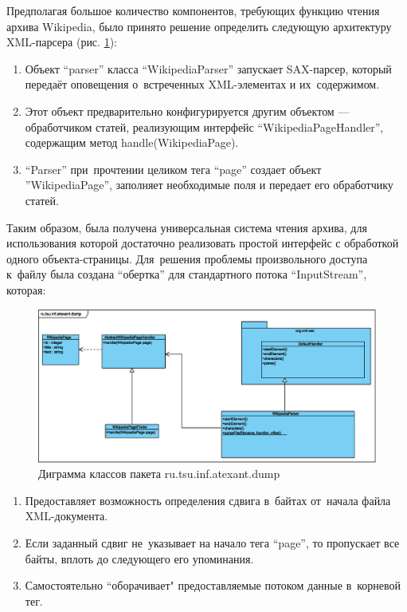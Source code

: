 Предполагая большое количество компонентов, требующих функцию чтения архива Wikipedia,
было принято решение определить следующую архитектуру XML-парсера (рис. \ref{uml:ru.tsu.inf.atexant.dump}):

\begin{enumerate}

\item{
Объект ``parser'' класса ``WikipediaParser'' запускает SAX-парсер, 
который передаёт оповещения о~встреченных XML-элементах и их~содержимом.
}

\item {
Этот объект предварительно конфигурируется другим объектом --- обработчиком статей,
 реализующим интерфейс ``WikipediaPageHandler'', 
содержащим метод handle(WikipediaPage).
}

\item{
``Parser'' при~прочтении целиком тега ``page'' создает объект ''WikipediaPage'', 
заполняет необходимые поля и передает его обработчику статей.
}

\end{enumerate}




Таким образом, была получена универсальная система чтения архива, 
для использования которой достаточно реализовать простой интерфейс с обработкой одного объекта-страницы.
Для~решения проблемы произвольного доступа к~файлу была создана ``обертка'' для стандартного потока ``InputStream'', которая:

\begin{figure}
\begin{center}
\includegraphics[scale=0.6]{eps/ru.tsu.inf.atexant.dump.eps}
\caption{Диграмма классов пакета ru.tsu.inf.atexant.dump}
\label{uml:ru.tsu.inf.atexant.dump}
\end{center}
\end{figure}

\begin{enumerate}

\item{
Предоставляет возможность определения сдвига в~байтах от~начала файла XML-документа.
}

\item {
Если заданный сдвиг не~указывает на начало тега ``page'', 
то пропускает все байты, 
вплоть до следующего его упоминания.
}

\item{
Самостоятельно “оборачивает" предоставляемые потоком данные в~корневой тег.
}

\end{enumerate}

